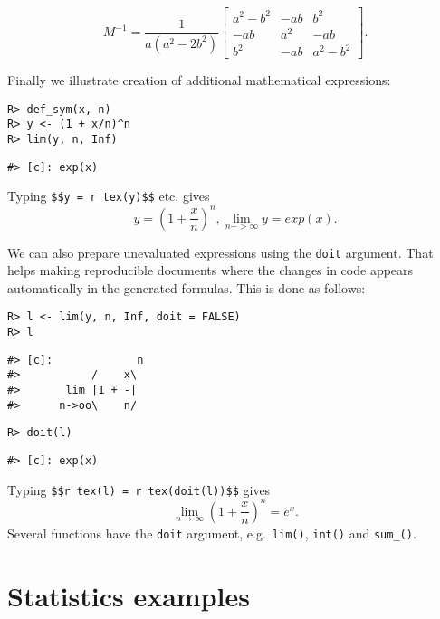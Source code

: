 \[
M^{-1} = \frac{1}{a \left(a^{2} - 2 b^{2}\right)}  \left[\begin{matrix}a^{2} - b^{2} & - a b & b^{2}\\- a b & a^{2} & - a b\\b^{2} & - a b & a^{2} - b^{2}\end{matrix}\right].
\]

Finally we illustrate creation of additional mathematical expressions:

\begin{verbatim}
R> def_sym(x, n)
R> y <- (1 + x/n)^n
R> lim(y, n, Inf)
\end{verbatim}

\begin{verbatim}
#> [c]: exp(x)
\end{verbatim}

Typing \texttt{\$\$y\ =\ \textasciigrave{}r\ tex(y)\textasciigrave{}\$\$} etc. gives
\[
y = \left(1 + \frac{x}{n}\right)^{n}, \lim_{n->\infty} y = exp(x) .
\]

We can also prepare unevaluated expressions using the \texttt{doit}
argument. That helps making reproducible documents where the changes
in code appears automatically in the generated formulas.
This is done as follows:

\begin{verbatim}
R> l <- lim(y, n, Inf, doit = FALSE)
R> l
\end{verbatim}

\begin{verbatim}
#> [c]:             n
#>           /    x\ 
#>       lim |1 + -| 
#>      n->oo\    n/
\end{verbatim}

\begin{verbatim}
R> doit(l)
\end{verbatim}

\begin{verbatim}
#> [c]: exp(x)
\end{verbatim}

Typing \texttt{\$\$\textasciigrave{}r\ tex(l)\textasciigrave{}\ =\ \textasciigrave{}r\ tex(doit(l))\textasciigrave{}\$\$} gives
\[
\lim_{n \to \infty} \left(1 + \frac{x}{n}\right)^{n} = e^{x} .
\]
Several functions have the \texttt{doit} argument, e.g.~\texttt{lim()}, \texttt{int()} and \texttt{sum\_()}.

\hypertarget{statistics-examples}{%
\section{Statistics examples}\label{statistics-examples}}

